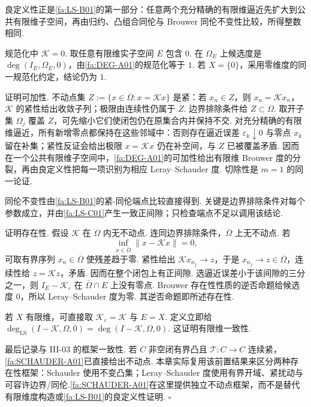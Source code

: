 \begin{FAProof}
良定义性正是\autoref{fa:LS-B01}的第一部分：任意两个充分精确的有限维逼近先扩大到公共有限维子空间，再由归约、凸组合同伦与 Brouwer 同伦不变性比较，所得整数相同.

规范化中 \(\displaystyle\mathcal K=0\). 取任意有限维实子空间 \(\displaystyle E\) 包含 \(\displaystyle0\). 在 \(\displaystyle\Omega_E\) 上候选度是 \(\displaystyle\deg(I_E,\Omega_E,0)\)，由\autoref{fa:DEG-A01}的规范化等于 \(\displaystyle1\). 若 \(\displaystyle X=\{0\}\)，采用零维度的同一规范化约定，结论仍为 \(\displaystyle1\).

证明可加性. 不动点集
\(\displaystyle Z := \{x\in\overline\Omega:x=\mathcal Kx\}\)
是紧：若 \(\displaystyle x_n\in Z\)，则 \(\displaystyle x_n=\mathcal Kx_n\)，\(\displaystyle\mathcal K\) 的紧性给出收敛子列；极限由连续性仍属于 \(\displaystyle Z\). 边界排除条件给 \(\displaystyle Z\subset\Omega\). 取开子集 \(\displaystyle\Omega_j\) 覆盖 \(\displaystyle Z\)，可先缩小它们使闭包仍在原集合内并保持不交. 对充分精确的有限维逼近，所有新增零点都保持在这些邻域中：否则存在逼近误差 \(\displaystyle\varepsilon_k\downarrow0\) 与零点 \(\displaystyle x_k\) 留在补集；紧性反证会给出极限 \(\displaystyle x=\mathcal Kx\) 仍在补空间，与 \(\displaystyle Z\) 已被覆盖矛盾. 因而在一个公共有限维子空间中，\autoref{fa:DEG-A01}的可加性给出有限维 Brouwer 度的分裂，再由良定义性把每一项识别为相应 Leray--Schauder 度. 切除性是 \(\displaystyle m=1\) 的同一论证.

同伦不变性由\autoref{fa:LS-B01}的紧-同伦端点比较直接得到. 关键是边界排除条件对每个参数成立，并由\autoref{fa:LS-C01}产生一致正间隙；只检查端点不足以调用该结论.

证明存在性. 假设 \(\displaystyle\mathcal K\) 在 \(\displaystyle\Omega\) 内无不动点. 连同边界排除条件，\(\displaystyle\overline\Omega\) 上无不动点. 若
\[
\inf_{x\in\overline\Omega}\|x-\mathcal Kx\|=0,
\]
可取有界序列 \(\displaystyle x_n\in\overline\Omega\) 使残差趋于零. 紧性给出 \(\displaystyle\mathcal Kx_{n_j}\to z\)，于是 \(\displaystyle x_{n_j}\to z\in\overline\Omega\)，连续性给 \(\displaystyle z=\mathcal Kz\)，矛盾. 因而在整个闭包上有正间隙. 选逼近误差小于该间隙的三分之一，则 \(\displaystyle I_E-\mathcal K_{\varepsilon}\) 在 \(\displaystyle\overline\Omega\cap E\) 上没有零点. Brouwer 存在性性质的逆否命题给候选度 \(\displaystyle0\)，所以 Leray--Schauder 度为零. 其逆否命题即所述存在性.

若 \(\displaystyle X\) 有限维，可直接取 \(\displaystyle\mathcal K_{\varepsilon}=\mathcal K\) 与 \(\displaystyle E=X\). 定义立即给
\(\displaystyle \deg_{\mathrm{LS}}(I-\mathcal K,\Omega,0) = \deg(I-\mathcal K,\Omega,0).\)
这证明有限维一致性.

最后记录与 III-03 的框架一致性. 若 \(\displaystyle C\) 非空闭有界凸且 \(\displaystyle\mathcal T:C\to C\) 连续紧，\autoref{fa:SCHAUDER-A01}已直接给出不动点. 本章实际复用该前置结果来区分两种存在性框架：Schauder 使用不变凸集；Leray--Schauder 度使用有界开域、紧扰动与可容许边界/同伦.\autoref{fa:SCHAUDER-A01}在这里提供独立不动点框架，而不是替代有限维度构造或\autoref{fa:LS-B01}的良定义性证明. \hfill\(\square\)
\end{FAProof}

